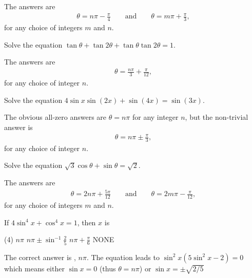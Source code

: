 \begin{solution}
The answers are 
\begin{align*}
    \theta = n\pi-\frac{\pi}{4} \qquad \text{and} \qquad  \theta = m\pi+\frac{\pi}{3},
\end{align*}
for any choice of integers $m$ and $n$.
\end{solution}


\begin{question}
Solve the equation $\tan \theta + \tan 2\theta + \tan \theta \tan 2\theta= 1$.
\end{question}

\begin{solution}
The answers are 
\begin{align*}
    \theta = \frac{n\pi}{3}+\frac{\pi}{12},
\end{align*}
for any choice of integer $n$.
\end{solution}


\begin{question}
Solve the equation $4\sin x \sin (2x) + \sin (4x)= \sin(3x)$.
\end{question}

\begin{solution}
The obvious all-zero answers are $\theta=n\pi$ for any integer $n$, but the non-trivial answer is  
\begin{align*}
    \theta = n\pi\pm\frac{\pi}{3},
\end{align*}
for any choice of integer $n$.
\end{solution}



\begin{question}
Solve the equation $\sqrt 3 \cos \theta + \sin \theta = \sqrt 2$.
\end{question}

\begin{solution}
The answers are 
\begin{align*}
    \theta = 2n\pi+\frac{5\pi}{12} \qquad \text{and} \qquad  \theta = 2m\pi-\frac{\pi}{12},
\end{align*}
for any choice of integers $m$ and $n$.
\end{solution}



\begin{question}[name=1989 Roorkee]
    If $4\sin^4 x + \cos^4 x = 1$, then $x$ is
    \begin{tasks}(4)
        \task \correct $n\pi$
        \task $\displaystyle n\pi \pm \sin^{-1}\frac{2}{5}$
        \task $\displaystyle n\pi+\frac{\pi}{6}$
        \task NONE
    \end{tasks}
\end{question}
\begin{solution}[name=1989 Roorkee]
    The correct answer is \correct, $n\pi$. The equation leads to $\sin^2 x(5\sin^2 x - 2)=0$ which means either $\sin x = 0$ (thus $\theta=n\pi$) or $\sin x = \pm \sqrt{2/5}$
\end{solution}

